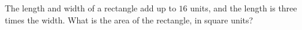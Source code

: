 The length and width of a rectangle add up to $16$ units, and the length is three times the width. What is the area of the rectangle, in square units?
